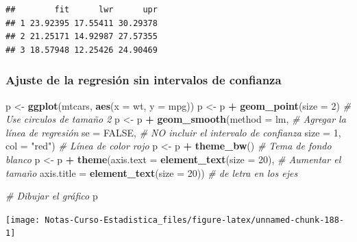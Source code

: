 \documentclass[
  12pt,
]{book}
\newenvironment{Shaded}{\begin{snugshade}}{\end{snugshade}}
\newcommand{\CommentTok}[1]{\textcolor[rgb]{0.56,0.35,0.01}{\textit{#1}}}
\newcommand{\DataTypeTok}[1]{\textcolor[rgb]{0.13,0.29,0.53}{#1}}
\newcommand{\DecValTok}[1]{\textcolor[rgb]{0.00,0.00,0.81}{#1}}
\newcommand{\KeywordTok}[1]{\textcolor[rgb]{0.13,0.29,0.53}{\textbf{#1}}}
\newcommand{\NormalTok}[1]{#1}
\newcommand{\OperatorTok}[1]{\textcolor[rgb]{0.81,0.36,0.00}{\textbf{#1}}}
\newcommand{\OtherTok}[1]{\textcolor[rgb]{0.56,0.35,0.01}{#1}}
\newcommand{\StringTok}[1]{\textcolor[rgb]{0.31,0.60,0.02}{#1}}
\theoremstyle{definition}
\theoremstyle{definition}
\theoremstyle{definition}
\theoremstyle{remark}
\begin{document}
\begin{verbatim}
##        fit      lwr      upr
## 1 23.92395 17.55411 30.29378
## 2 21.25171 14.92987 27.57355
## 3 18.57948 12.25426 24.90469
\end{verbatim}

\hypertarget{ajuste-de-la-regresiuxf3n-sin-intervalos-de-confianza}{%
\subsubsection{Ajuste de la regresión sin intervalos de confianza}\label{ajuste-de-la-regresiuxf3n-sin-intervalos-de-confianza}}

\begin{Shaded}
\begin{Highlighting}[]
\NormalTok{p <-}\StringTok{ }\KeywordTok{ggplot}\NormalTok{(mtcars, }\KeywordTok{aes}\NormalTok{(}\DataTypeTok{x =}\NormalTok{ wt, }\DataTypeTok{y =}\NormalTok{ mpg)) }
\NormalTok{p <-}\StringTok{ }\NormalTok{p }\OperatorTok{+}\StringTok{ }\KeywordTok{geom_point}\NormalTok{(}\DataTypeTok{size =} \DecValTok{2}\NormalTok{)       }\CommentTok{# Use circulos de tamaño 2}
\NormalTok{p <-}\StringTok{ }\NormalTok{p }\OperatorTok{+}\StringTok{ }\KeywordTok{geom_smooth}\NormalTok{(}\DataTypeTok{method =}\NormalTok{ lm,   }\CommentTok{# Agregar la línea de regresión }
              \DataTypeTok{se =} \OtherTok{FALSE}\NormalTok{,           }\CommentTok{# NO incluir el intervalo de confianza   }
              \DataTypeTok{size =} \DecValTok{1}\NormalTok{,}
              \DataTypeTok{col =} \StringTok{"red"}\NormalTok{)          }\CommentTok{# Línea de color rojo }
\NormalTok{p <-}\StringTok{ }\NormalTok{p }\OperatorTok{+}\StringTok{ }\KeywordTok{theme_bw}\NormalTok{()                 }\CommentTok{# Tema de fondo blanco}
\NormalTok{p <-}\StringTok{ }\NormalTok{p }\OperatorTok{+}\StringTok{ }\KeywordTok{theme}\NormalTok{(}\DataTypeTok{axis.text =} \KeywordTok{element_text}\NormalTok{(}\DataTypeTok{size =} \DecValTok{20}\NormalTok{),  }\CommentTok{# Aumentar el tamaño }
               \DataTypeTok{axis.title =} \KeywordTok{element_text}\NormalTok{(}\DataTypeTok{size =} \DecValTok{20}\NormalTok{)) }\CommentTok{# de letra en los ejes}

\CommentTok{# Dibujar el gráfico}
\NormalTok{p   }
\end{Highlighting}
\end{Shaded}

\begin{center}\texttt{[image: Notas-Curso-Estadistica\_files/figure-latex/unnamed-chunk-188-1]} \end{center}
\end{document}
